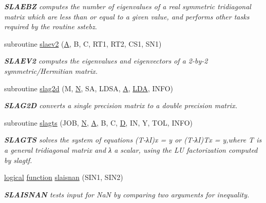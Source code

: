 \begin{DoxyCompactItemize}
\begin{DoxyCompactList}\small\item\em {\bfseries S\+L\+A\+E\+B\+Z} computes the number of eigenvalues of a real symmetric tridiagonal matrix which are less than or equal to a given value, and performs other tasks required by the routine sstebz. \end{DoxyCompactList}\item 
subroutine \hyperlink{group__auxOTHERauxiliary_gaf79f0bb1a07a9d96b827eba946ec79fa}{slaev2} (\hyperlink{classA}{A}, B, C, R\+T1, R\+T2, C\+S1, S\+N1)
\begin{DoxyCompactList}\small\item\em {\bfseries S\+L\+A\+E\+V2} computes the eigenvalues and eigenvectors of a 2-\/by-\/2 symmetric/\+Hermitian matrix. \end{DoxyCompactList}\item 
subroutine \hyperlink{group__auxOTHERauxiliary_gac8ea5cb7fd597f6b5ae9cade02d122b3}{slag2d} (M, \hyperlink{polmisc_8c_a0240ac851181b84ac374872dc5434ee4}{N}, S\+A, L\+D\+S\+A, \hyperlink{classA}{A}, \hyperlink{example__user_8c_ae946da542ce0db94dced19b2ecefd1aa}{L\+D\+A}, I\+N\+F\+O)
\begin{DoxyCompactList}\small\item\em {\bfseries S\+L\+A\+G2\+D} converts a single precision matrix to a double precision matrix. \end{DoxyCompactList}\item 
subroutine \hyperlink{group__auxOTHERauxiliary_gae4b431608960457e61e885f3a2e2b18e}{slagts} (J\+O\+B, \hyperlink{polmisc_8c_a0240ac851181b84ac374872dc5434ee4}{N}, \hyperlink{classA}{A}, B, C, \hyperlink{odrpack_8h_a7dae6ea403d00f3687f24a874e67d139}{D}, I\+N, Y, T\+O\+L, I\+N\+F\+O)
\begin{DoxyCompactList}\small\item\em {\bfseries S\+L\+A\+G\+T\+S} solves the system of equations (T-\/λ\+I)x = y or (T-\/λ\+I)Tx = y,where T is a general tridiagonal matrix and λ a scalar, using the L\+U factorization computed by slagtf. \end{DoxyCompactList}\item 
\hyperlink{tnc_8c_aa7b64cdf39500931f7b333343791a104}{logical} \hyperlink{afunc_8m_a7b5e596df91eadea6c537c0825e894a7}{function} \hyperlink{group__auxOTHERauxiliary_ga9b6a1036554ed9b7196c641174d6a6da}{slaisnan} (S\+I\+N1, S\+I\+N2)
\begin{DoxyCompactList}\small\item\em {\bfseries S\+L\+A\+I\+S\+N\+A\+N} tests input for Na\+N by comparing two arguments for inequality. \end{DoxyCompactList}\item 

\end{DoxyCompactItemize}
